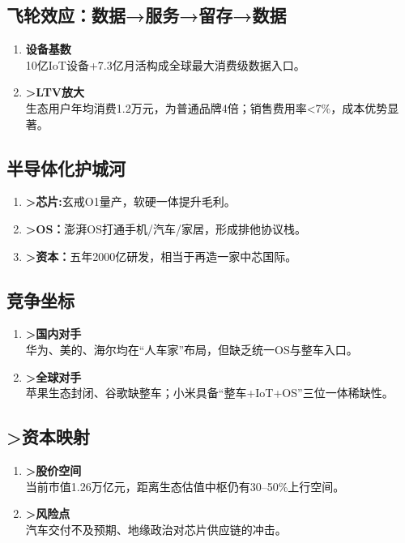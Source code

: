 \subsection{飞轮效应：数据→服务→留存→数据}
\begin{enumerate}[leftmargin=*, nosep]
    \item \textbf{设备基数}  \\
    10亿IoT设备+7.3亿月活构成全球最大消费级数据入口。
    \item \textbf{>LTV放大}\\  
    生态用户年均消费1.2万元，为普通品牌4倍；销售费用率<7\%，成本优势显著。
\end{enumerate}

\subsection{半导体化护城河}
\begin{enumerate}[leftmargin=*, nosep]
    \item \textbf{>芯片:}玄戒O1量产，软硬一体提升毛利。  
    \item \textbf{>OS：}澎湃OS打通手机/汽车/家居，形成排他协议栈。  
    \item \textbf{>资本：}五年2000亿研发，相当于再造一家中芯国际。
\end{enumerate}

\subsection{竞争坐标}
\begin{enumerate}[leftmargin=*, nosep]
    \item \textbf{>国内对手}\\  
    华为、美的、海尔均在“人车家”布局，但缺乏统一OS与整车入口。
    \item \textbf{>全球对手}\\  
    苹果生态封闭、谷歌缺整车；小米具备{\color{red}“整车+IoT+OS”三位一体}稀缺性。
\end{enumerate}

\subsection{>资本映射}
\begin{enumerate}[leftmargin=*, nosep]
    \item \textbf{>股价空间}\\  
    当前市值1.26万亿元，距离生态估值中枢仍有30–50\%上行空间。
    \item \textbf{>风险点}\\  
    汽车交付不及预期、地缘政治对芯片供应链的冲击。
\end{enumerate}

